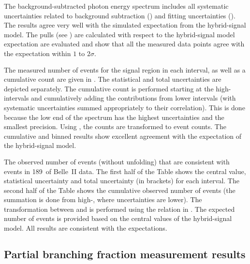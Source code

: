 The background-subtracted photon energy spectrum includes all systematic uncertainties related 
to background subtraction ()
and fitting uncertainties ().
The results agree very well with the simulated expectation from the hybrid-signal model.
The pulls (see ) are calculated with respect to the hybrid-signal model expectation are evaluated 
and show that all the measured data points agree with the expectation within $1$ to $2\sigma$.

The measured number of events for the signal region in each \EB interval, as well as a cumulative count are given in .
The statistical and total uncertainties are depicted separately.
The cumulative count is performed starting at the high-\EB intervals and cumulatively adding the contributions from lower \EB intervals (with systematic uncertainties summed appropriately to their correlation).
This is done because the low end of the \EB spectrum has the highest uncertainties and the smallest precision.
Using , the \BtoXsdgamma counts are transformed to \BtoXsgamma event counts.
The cumulative and binned results show excellent agreement with the expectation of the hybrid-signal model.

\begin{table}
    \caption{\label{tab:observed_events}
    The observed number of events (without unfolding) that are consistent with \BtoXsdgamma events in 189~\invfb of Belle~II data.
    The first half of the Table shows the central value, statistical uncertainty and total uncertainty (in brackets) for each \EB interval.
    The second half of the Table shows the cumulative observed number of events (the summation is done from high-\EB, where uncertainties are lower).
    The transformation between \BtoXsdgamma and \BtoXsgamma is performed using the relation in .
    The expected number of \BtoXsgamma events is provided based on the central values of the hybrid-signal model.
    All results are consistent with the expectations.
    }
    
\end{table}


\subsection{Partial branching fraction measurement results}\label{sec:partial_branching_fraction_results}

